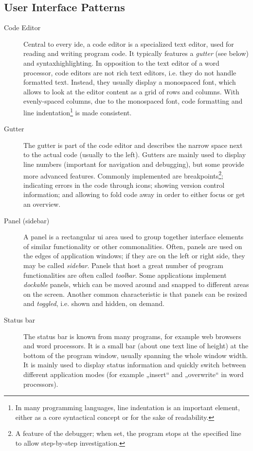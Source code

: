 \subsection{User Interface Patterns}\label{user-interface-patterns}

\begin{description}
\item[Code Editor]
Central to every \gls{ide}, a code editor is a specialized text editor,
used for reading and writing program code. It typically features a
\emph{gutter} (see below) and \gls{syntaxhighlighting}. In opposition to
the text editor of a word processor, code editors are not rich text
editors, i.e. they do not handle formatted text. Instead, they usually
display a monospaced font, which allows to look at the editor content as
a grid of rows and columns. With evenly-spaced columns, due to the
monospaced font, code formatting and line
indentation\footnote{In many programming languages, line indentation is an important element, either as a core syntactical concept or for the sake of readability.}
is made consistent.
\item[Gutter]
The gutter is part of the code editor and describes the narrow space
next to the actual code (usually to the left). Gutters are mainly used
to display line numbers (important for navigation and debugging), but
some provide more advanced features. Commonly implemented are
breakpoints\footnote{A feature of the debugger; when set, the program stops at the specified line to allow step-by-step investigation.};
indicating errors in the code through icons; showing version control
information; and allowing to fold code away in order to either focus or
get an overview.
\item[Panel (sidebar)]
A panel is a rectangular \ac{ui} area used to group together interface
elements of similar functionality or other commonalities. Often, panels
are used on the edges of application windows; if they are on the left or
right side, they may be called \emph{sidebar}. Panels that host a great
number of program functionalities are often called \emph{toolbar}. Some
applications implement \emph{dockable} panels, which can be moved around
and snapped to different areas on the screen. Another common
characteristic is that panels can be resized and \emph{toggled}, i.e.
shown and hidden, on demand.
\item[Status bar]
The status bar is known from many programs, for example web browsers and
word processors. It is a small bar (about one text line of height) at
the bottom of the program window, usually spanning the whole window
width. It is mainly used to display status information and quickly
switch between different application modes (for example „insert“ and
„overwrite“ in word processors).
\end{description}

